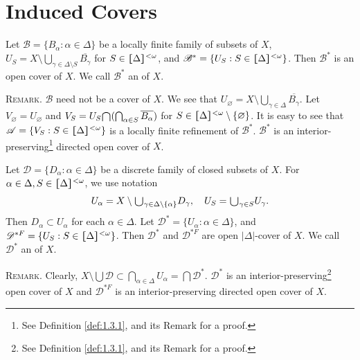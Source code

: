 \documentclass[prelim.tex]{subfiles}
\begin{document}
	\section{Induced Covers}  
    \label{sec:1.2}


{\label{def:1.2.1} 
Let $\mathscr{B}=\{B_\alpha: \alpha\in\Delta\}$ be a locally finite
family of subsets of $X$, $U_S = X \setminus \bigcup_{\gamma \in\Delta\setminus S} \overline{B_\gamma}$ for $S\in \hstretch{1.8}{[}\Delta\hstretch{1.8}{]}^{<\omega}$, and 
$\mathscr{B}^* = \{U_S: S\in \hstretch{1.8}{[}\Delta\hstretch{1.8}{]}^{<\omega}\}$. 
Then $\mathscr{B}^*$ 
is an open cover of $X$. We call $\mathscr{B}^*$ an 
of $X$.
}%

\vspace{8pt}
\noindent\textsc{Remark}. 
$\mathscr{B}$ need not be a cover of $X$. 
We see that $U_{\varnothing} = X\setminus  \bigcup_{\gamma \in\Delta} \overline{B_\gamma}$.
Let $V_\varnothing = U_\varnothing$ and $V_S = U_S\raisebox{-2pt}{\scalebox{1.5}{$\cap$}}
 (\bigcap_{\alpha\in S} \overline{B_\alpha})$ 
for $S\in \hstretch{1.8}{[}\Delta\hstretch{1.8}{]}^{<\omega} \setminus\{\varnothing\}$.
It is easy to see that 
$\mathscr{A} = \{V_S: S\in \hstretch{1.8}{[}\Delta\hstretch{1.8}{]}^{<\omega}\}$ 
is a locally finite refinement of $\mathscr{B}^*$.
$\mathscr{B}^*$ is an interior-preserving\footnote{See Definition \ref{def:1.3.1}, and its Remark for a
	proof.} 
directed open cover of $X$. 

{\label{def:1.2.2}
Let $\mathscr{D} = \{D_\alpha: \alpha \in \Delta\}$ be a discrete family of 
closed subsets of $X$.
For $\alpha\in\Delta, S\in\hstretch{1.8}{[}\Delta\hstretch{1.8}{]}^{<\omega}$, we use notation 
\begin{gather}
	U_\alpha = X \setminus \raisebox{-2pt}{\scalebox{1.5}{$\cup$}}_{\gamma\in\Delta\setminus\{\alpha\}}D_\gamma,\quad
	U_S =  \raisebox{-2pt}{\scalebox{1.5}{$\cup$}}_{\gamma\in S}U_\gamma. \label{eq:1.2.2.1}
\end{gather}
Then $D_\alpha \subset U_\alpha$ for each $\alpha\in\Delta$.
Let $\mathscr{D}^* = \{ U_\alpha: \alpha\in\Delta\}$, 
and
$\mathscr{D}^{*F} = \{U_S: S\in \hstretch{1.8}{[}\Delta\hstretch{1.8}{]}^{<\omega}\}$.
Then $\mathscr{D}^*$ and $\mathscr{D}^{*F}$ are open $|\Delta|$-cover of $X$.
We call $\mathscr{D}^*$ an  of $X$.
} %

\vspace{10pt}
\noindent\textsc{Remark}. 
Clearly, $X \setminus \bigcup\mathscr{D}\subset \bigcap_{\alpha\in\Delta}U_\alpha 
= \bigcap\mathscr{D}^*$.
$\mathscr{D}^*$ is an interior-preserving\footnote{See Definition \ref{def:1.3.1}, and its Remark
	for a proof.}  
open cover of $X$
and $\mathscr{D}^{*F}$ is an interior-preserving directed open cover of $X$. 
\end{document}
